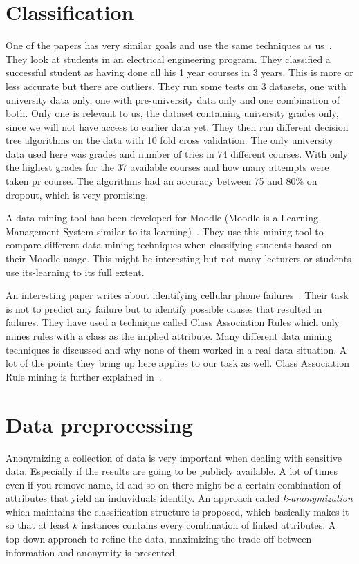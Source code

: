 \section{Classification}\label{ch:relclass}
One of the papers has very similar goals and use the same techniques as us~\cite{7}.
They look at students in an electrical engineering program. 
They classified a successful student as having done all his 1 year courses in 3 years. 
This is more or less accurate but there are outliers. 
They run some tests on 3 datasets, one with university data only, one with pre-university data only and one combination of both. 
Only one is relevant to us, the dataset containing university grades only, since we will not have access to earlier data yet. 
They then ran different decision tree algorithms on the data with 10 fold cross validation. 
The only university data used here was grades and number of tries in 74 different courses. 
With only the highest grades for the 37 available courses and how many attempts were taken pr course.
The algorithms had an accuracy between 75 and 80\% on dropout, which is very promising.

\bigskip\noindent
A data mining tool has been developed for Moodle (Moodle is a Learning Management System similar to its-learning)~\cite{12}.
They use this mining tool to compare different data mining techniques when classifying students based on their Moodle usage. 
This might be interesting but not many lecturers or students use its-learning to its full extent. 

\bigskip\noindent
An interesting paper writes about identifying cellular phone failures~\cite{3}.
Their task is not to predict any failure but to identify possible causes that resulted in failures.  
They have used a technique called Class Association Rules which only mines rules with a class as the implied attribute. 
Many different data mining techniques is discussed and why none of them worked in a real data situation. 
A lot of the points they bring up here applies to our task as well.
Class Association Rule mining is further explained in~\cite{4}.

\section{Data preprocessing}
Anonymizing a collection of data is very important when dealing with sensitive data. 
Especially if the results are going to be publicly available. 
A lot of times even if you remove name, id and so on there might be a certain combination of attributes that yield an induviduals identity.
An approach called \textit{k-anonymization} which maintains the classification structure is proposed, 
which basically makes it so that at least $k$ instances contains every combination of linked attributes. 
A top-down approach to refine the data, maximizing the trade-off between information and anonymity is presented.~\cite{14}

